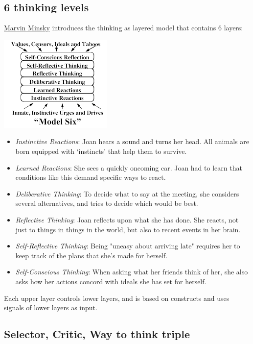 \documentclass{acm_proc_article-sp}
\begin{document}
\subsection{6 thinking levels}

\href{http://web.media.mit.edu/~minsky/E5/eb5.html}{Marvin Minsky} introduces the thinking as layered model that contains 6 layers:

\includegraphics[scale=0.9]{model_6.png}

\begin{itemize}
 \item \emph{Instinctive Reactions}:  Joan hears a sound and turns her head. All animals are born equipped with ‘instincts’ that help them to survive.
 \item \emph{Learned Reactions}: She sees a quickly oncoming car. Joan had to learn that conditions like this demand specific ways to react.
 \item \emph{Deliberative Thinking}: To decide what to say at the meeting, she considers several alternatives, and tries to decide which would be best.
 \item \emph{Reflective Thinking}: Joan reflects upon what she has done. She reacts, not just to things in things in the world, but also to recent events in her brain.
 \item \emph{Self-Reflective Thinking}: Being "uneasy about arriving late" requires her to keep track of the plans that she's made for herself.
 \item \emph{Self-Conscious Thinking}: When asking what her friends think of her, she also asks how her actions concord with ideals she has set for herself.
\end{itemize}

Each upper layer controls lower layers, and is based on constructs and uses signals of lower layers as input.

\subsection{Selector, Critic, Way to think triple}
\end{document}
